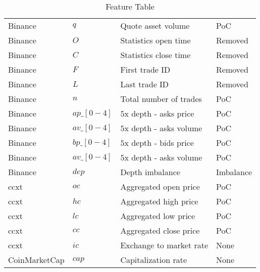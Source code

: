 \begin{table}
\begin{tabular}{|l|l|l|l|}
            Binance         & $q$           & Quote asset volume            & PoC       \\
            Binance         & $O$           & Statistics open time          & Removed   \\
            Binance         & $C$           & Statistics close time         & Removed   \\
            Binance         & $F$           & First trade ID                & Removed   \\
            Binance         & $L$           & Last trade ID                 & Removed   \\
            Binance         & $n$           & Total number of trades        & PoC       \\
            Binance         & $ap\_[0-4]$   & $5$x depth - asks price       & PoC       \\
            Binance         & $av\_[0-4]$   & $5$x depth - asks volume      & PoC       \\
            Binance         & $bp\_[0-4]$   & $5$x depth - bids price       & PoC       \\
            Binance         & $av\_[0-4]$   & $5$x depth - asks volume      & PoC       \\
            Binance         & $dep$         & Depth imbalance               & Imbalance \\
            ccxt            & $oc$          & Aggregated open price         & PoC       \\
            ccxt            & $hc$          & Aggregated high price         & PoC       \\
            ccxt            & $lc$          & Aggregated low price          & PoC       \\
            ccxt            & $cc$          & Aggregated close price        & PoC       \\
            ccxt            & $ic$          & Exchange to market rate       & None      \\
            CoinMarketCap   & $cap$         & Capitalization rate           & None      \\
    \hline
    \end{tabular}
    \caption{Feature Table}
    \label{tab:feature_table}
\end{table}
